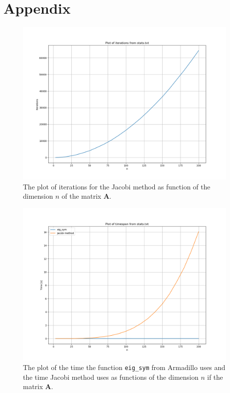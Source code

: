 \documentclass{article}
\begin{document}
\vspace{1cm}

\section{Appendix} \label{sec:Appendix}

\begin{figure}[ht]
	\centering
	\includegraphics[width = 11cm]{iterations-stats.png}
	\caption{The plot of iterations for the Jacobi method as function of the dimension $n$ of the matrix \textbf{A}. }
  \label{fig:iterationspng}
\end{figure}


\begin{figure}[ht]
	\centering
	\includegraphics[width = 11cm]{timespan-stats.png}
	\caption{The plot of the time the function \texttt{eig\_sym} from Armadillo uses and the time Jacobi method uses as functions of the dimension $n$ if the matrix \textbf{A}. }
  \label{fig:timespanpng}
\end{figure}
\end{document}
